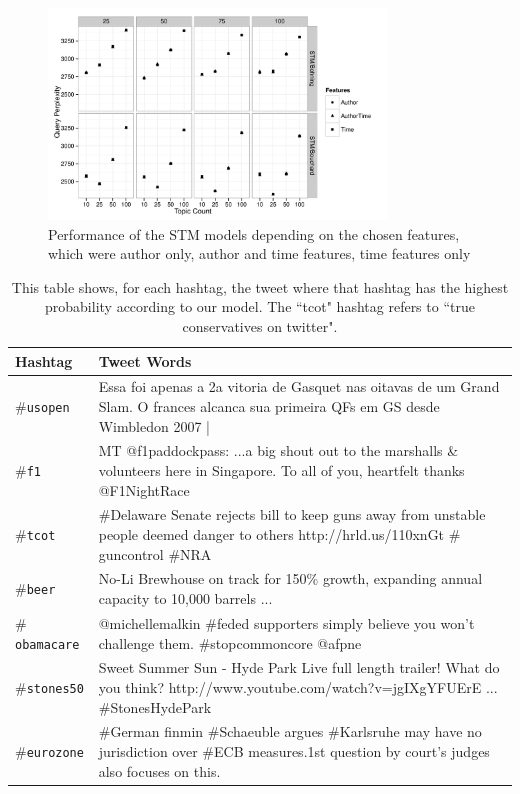 \begin{figure}
\centering
    \includegraphics[width=0.8\textwidth]{plots/TweetStmQueryFeatures.pdf}
    \caption{Performance of the STM models depending on the chosen features, which were author only, author and time features, time features only}
    \label{fig:stm-p-all}
\end{figure}

\begin{table}
    \centering
    \begin{tabular}{| l || p{9cm} | } \hline 
        \bf{Hashtag} & %
        \bf{Tweet Words} \\ \hline
        $\#$\tt{usopen} & %
        Essa foi apenas a 2a vitoria de Gasquet nas oitavas de um Grand Slam. O frances alcanca sua primeira QFs em GS desde Wimbledon 2007 | \\ \hline
        $\#$\tt{f1} & %
         MT @f1paddockpass: ...a big shout out to the marshalls \& volunteers here in Singapore. To all of you, heartfelt thanks @F1NightRace \\ \hline
        $\#$\tt{tcot} & %
        $\#$Delaware Senate rejects bill to keep guns away from unstable people deemed danger to others http://hrld.us/110xnGt $\#$guncontrol $\#$NRA \\ \hline
        $\#$\tt{beer} & %
        No-Li Brewhouse on track for 150\% growth, expanding annual capacity to 10,000 barrels ... \\ \hline
        $\#$\tt{obamacare} & %
        @michellemalkin $\#$feded supporters simply believe you won't challenge them. $\#$stopcommoncore @afpne \\ \hline
        $\#$\tt{stones50} & %
        Sweet Summer Sun - Hyde Park Live full length trailer! What do you think? http://www.youtube.com/watch?v=jgIXgYFUErE ... $\#$StonesHydePark \\ \hline
        $\#$\tt{eurozone} & %
        $\#$German finmin $\#$Schaeuble argues $\#$Karlsruhe may have no jurisdiction over $\#$ECB measures.1st question by court's judges also focuses on this. \\ \hline
    \end{tabular}
    \caption{This table shows, for each hashtag, the tweet where that hashtag has the highest probability according to our model. The ``tcot" hashtag refers to ``true conservatives on twitter".}
    \label{tbl:generative}
\end{table}

